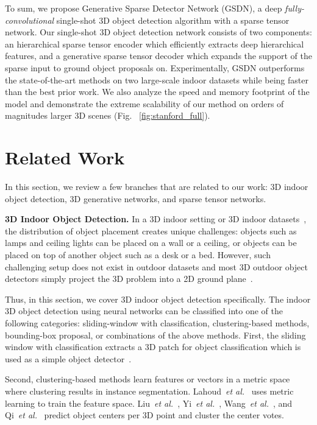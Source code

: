 \documentclass[runningheads]{llncs}
\newcommand{\etal}{\textit{et al.}}
\newcommand{\hidden}[1]{}
\newcommand{\methodname}{GSDN\xspace}
\begin{document}
To sum, we propose Generative Sparse Detector Network (\methodname), a deep \textit{fully-convolutional} single-shot 3D object detection algorithm with a sparse tensor network. Our single-shot 3D object detection network consists of two components: an hierarchical sparse tensor encoder which efficiently extracts deep hierarchical features, and a generative sparse tensor decoder which expands the support of the sparse input to ground object proposals on. Experimentally, \methodname outperforms the state-of-the-art methods on two large-scale indoor datasets while being faster than the best prior work. We also analyze the speed and memory footprint of the model and demonstrate the extreme scalability of our method on orders of magnitudes larger 3D scenes (Fig. ~\ref{fig:stanford_full}).





 \section{Related Work}

In this section, we review a few branches that are related to our work: 3D indoor object detection, 3D generative networks, and sparse tensor networks.




\noindent\textbf{3D Indoor Object Detection.}
In a 3D indoor setting or 3D indoor datasets~\cite{dai2017scannet,armeni_cvpr16}, the distribution of object placement creates unique challenges: objects such as lamps and ceiling lights can be placed on a wall or a ceiling, or objects can be placed on top of another object such as a desk or a bed. However, such challenging setup does not exist in outdoor datasets and most 3D outdoor object detectors simply project the 3D problem into a 2D ground plane~\cite{maturana_iros_2015,li2016vehicle,Zhou_2018_CVPR}.


Thus, in this section, we cover 3D indoor object detection specifically. The indoor 3D object detection using neural networks can be classified into one of the following categories: sliding-window with classification, clustering-based methods, bounding-box proposal, or combinations of the above methods. 
First, the sliding window with classification extracts a 3D patch for object classification which is used as a simple object detector~\cite{DeepSlidingShapes,armeni_cvpr16}\hidden{Deep Sliding Shapes}.

Second, clustering-based methods learn features or vectors in a metric space where clustering results in instance segmentation. Lahoud~\etal~\cite{lahoud20193d}\hidden{MTML} uses metric learning to train the feature space. Liu~\etal~\cite{liu2019masc}\hidden{MASC}, Yi~\etal~\cite{yi2019gspn}\hidden{GSPN}, Wang~\etal~\cite{wang2018sgpn}\hidden{SGPN}, and Qi~\etal~\cite{qi2019deep}\hidden{Hough voting~\cite{qi2019deep}} predict object centers per 3D point and cluster the center votes.
\end{document}
